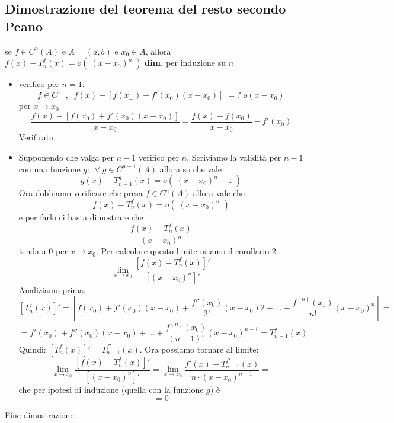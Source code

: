 \subsection*{Dimostrazione del teorema del resto secondo Peano}
se $ f \in C^n (A)$ e $A= (a,b)$ e $x_0 \in A$, allora $f(x) - T_n^{f} (x) = o( \; (x- x_0)^n \;)$\newline
\textbf{dim.} per induzione su $n$
\begin{itemize}
    \item verifico per $n = 1$:\newline
        \[
            f \in C^1 \;\;, \;\; f(x) - [f(x_=) + f'(x_0) (x-x_0)]  \; =? \; o (x-x_0)
        \] 
        per $x \rightarrow x_0$
        \[
            \frac{f(x) - [f(x_0) + f'(x_0) (x-x_0)]}{x-x_0} = \frac{f(x) -f(x_0)}{x-x_0} - f'(x_0)
        \]
        Verificata.
    \item Supponendo che valga per $n-1$ verifico per $n$.\newline
    Scriviamo la validità per $n-1$ con una funzione $g$: $\;\forall\; g \in C^{n-1}(A)$ allora so che vale
    \[
        g(x) -T_{n-1}^g (x) = o( \; (x-x_0)^n-1\;)
    \]
     Ora dobbiamo verificare che presa $f \in C^n(A)$ allora vale che 
     \[
        f(x) - T_n^f(x) = o(\; (x-x_0)^n \;)
     \] 
     e per farlo ci basta dimostrare che 
     \[
        \frac{f(x) - T_n^f(x)}{(x-x_0)^n}
     \]
     tenda a $0$ per $x \rightarrow x_0$. Per calcolare questo limite usiamo il corollario 2: 
    \[
        \lim_{x \rightarrow x_0} \frac{[f(x) - T_n^f(x)]'}{[(x-x_0)^n]'}
    \]
    Analiziamo prima:
    \[
        [T_n^f(x)]' = [f(x_0) + f'(x_0)(x-x_0) + \frac{f''(x_0)}{2!}(x-x_0)2 + \dots + \frac{f^{(n)}(x_0)}{n!}(x-x_0)^n] =
    \]
    \[
        = f'(x_0) + f''(x_0)(x-x_0) + \dots + \frac{f^{(n)}(x_0)}{(n-1)!}(x-x_0)^{n-1} = T_{n-1}^{f'}(x)
    \]
    Quindi: $[T_n^f(x)]' = T_{n-1}^{f'}(x)$.\newline
    Ora possiamo tornare al limite:
    \[
        \lim_{x \rightarrow x_0} \frac{[f(x) - T_n^f(x)]'}{[(x-x_0)^n]'} = \lim_{x \rightarrow x_0} \frac{f'(x) - T_{n-1}^{f'}(x)}{n \cdot  (x-x_0)^{n-1}} =
    \]
    che per ipotesi di induzione (quella con la funzione $g$) è
    \[
        = 0
    \]
\end{itemize}
Fine dimostrazione.\newline
\newline
\newline
